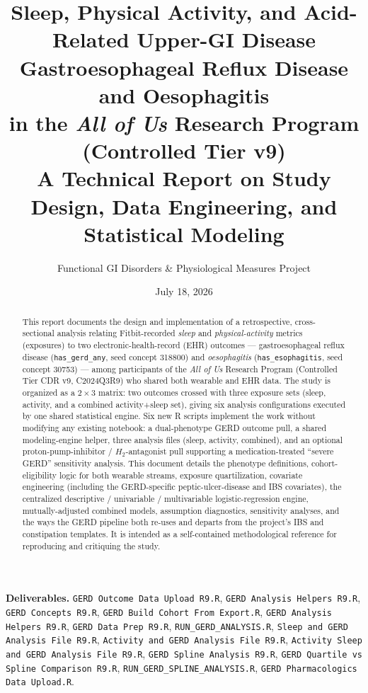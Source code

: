 \documentclass[11pt]{article}
\title{\vspace{-1.2cm}\textbf{\color{headblue}Sleep, Physical Activity, and Acid-Related Upper-GI Disease}\\[3pt]
\textbf{\color{headblue}Gastroesophageal Reflux Disease and Oesophagitis}\\[3pt]
\textbf{\color{headblue}in the \textit{All of Us} Research Program (Controlled Tier v9)}\\[6pt]
\large A Technical Report on Study Design, Data Engineering, and Statistical Modeling}
\author{Functional GI Disorders \& Physiological Measures Project}
\date{July 18, 2026}
\newcommand{\code}[1]{\texttt{\small #1}}
\begin{document}
\maketitle
\thispagestyle{fancy}

\begin{abstract}
\noindent This report documents the design and implementation of a retrospective, cross-sectional
analysis relating Fitbit-recorded \emph{sleep} and \emph{physical-activity} metrics (exposures) to two
electronic-health-record (EHR) outcomes --- gastroesophageal reflux disease
(\code{has_gerd_any}, seed concept 318800) and \emph{oesophagitis}
(\code{has_esophagitis}, seed concept 30753) --- among
participants of the \emph{All of Us} Research Program (Controlled Tier CDR v9, C2024Q3R9) who shared
both wearable and EHR data. The study is organized as a $2\times3$ matrix: two outcomes crossed with
three exposure sets (sleep, activity, and a combined activity+sleep set), giving six analysis
configurations executed by one shared statistical engine. Six new R scripts implement the work without
modifying any existing notebook: a dual-phenotype GERD outcome pull, a shared modeling-engine helper,
three analysis files (sleep, activity, combined), and an optional proton-pump-inhibitor /
$H_2$-antagonist pull supporting a medication-treated ``severe GERD'' sensitivity analysis. This
document details the phenotype definitions, cohort-eligibility logic for both wearable streams,
exposure quartilization, covariate engineering (including the GERD-specific peptic-ulcer-disease and
IBS covariates), the centralized descriptive / univariable / multivariable logistic-regression engine,
mutually-adjusted combined models, assumption diagnostics, sensitivity analyses, and the ways the GERD
pipeline both re-uses and departs from the project's IBS and constipation templates. It is intended as
a self-contained methodological reference for reproducing and critiquing the study.
\end{abstract}

\vspace{0.4em}
{\small\noindent\textbf{Deliverables.}
\code{GERD Outcome Data Upload R9.R},\;
\code{GERD Analysis Helpers R9.R},\;
\code{GERD Concepts R9.R},\;
\code{GERD Build Cohort From Export.R},\;
\code{GERD Analysis Helpers R9.R},\;
\code{GERD Data Prep R9.R},\;
\code{RUN\_GERD\_ANALYSIS.R},\;
\code{Sleep and GERD Analysis File R9.R},\;
\code{Activity and GERD Analysis File R9.R},\;
\code{Activity Sleep and GERD Analysis File R9.R},\;
\code{GERD Spline Analysis R9.R},\;
\code{GERD Quartile vs Spline Comparison R9.R},\;
\code{RUN\_GERD\_SPLINE\_ANALYSIS.R},\;
\code{GERD Pharmacologics Data Upload.R}.}
\end{document}

